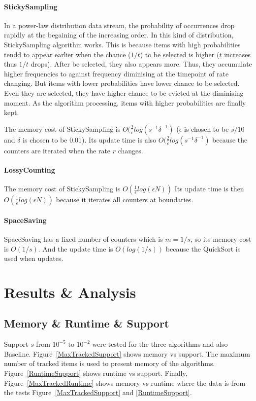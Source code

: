 \documentclass[10pt]{article}
\begin{document}
\paragraph{StickySampling}
In a power-law distribution data stream, the probability of occurrences drop rapidly at the begaining 
of the increasing order. In this kind of distribution, StickySampling algorithm works. 
This is because items with high probabilities tendd to appear earlier when the chance ($1/t$) to be selected is higher ($t$ increases thus $1/t$ drops).
After be selected, they also appears more. Thus, they accumulate higher frequencies to against frequency diminising at the timepoint of rate changing.
But items with lower probabilities have lower chance to be selected. 
Even they are selected, they have higher chance to be evicted at the diminising moment.
As the algorithm processing, items with higher probabilities are finally kept.

The memory cost of StickySampling is $O(\frac{2}{\epsilon}log(s^{-1}\delta^{-1})$ \cite{stickylossy}
($\epsilon{}$ is chosen to be $s/10$ and $\delta{}$ is chosen to be 0.01).
Its update time is also $O(\frac{2}{\epsilon}log(s^{-1}\delta^{-1})$ because the counters are iterated when the rate $r$ changes.
\paragraph{LossyCounting}
The memory cost of StickySampling is $O(\frac{1}{\epsilon}log(\epsilon{}N))$ 
Its update time is then $O(\frac{1}{\epsilon}log(\epsilon{}N))$ because it iterates all counters at boundaries.
\paragraph{SpaceSaving}
SpaceSaving has a fixed number of counters which is $m = 1/s$, so its memory cost is $O(1/s)$. 
And the update time is $O(log(1/s))$ because the QuickSort is used when updates.

\section{Results \& Analysis} \label{resultsanalysis}

\subsection{Memory \& Runtime \& Support}
Support $s$ from $10^{-5}$ to $10^{-2}$ were tested for the three algorithms and also Baseline.
Figure~\ref{MaxTrackedSupport} shows memory vs support. 
The maximum number of tracked items is used to present memory of the algorithms.
Figure~\ref{RuntimeSupport} shows runtime vs support.
Finally, Figure~\ref{MaxTrackedRuntime} shows memory vs runtime 
where the data is from the tests Figure~\ref{MaxTrackedSupport} and \ref{RuntimeSupport}.
\end{document}
